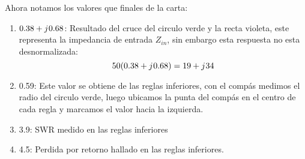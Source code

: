 \documentclass[
	12pt, %
	fleqn, %
	a4paper, %
]{LegrandOrangeBook}
\begin{document}
\begin{example}
\begin{center}
\end{center}
Ahora notamos los valores que finales de la carta:
\begin{enumerate}
\item $0.38+{j\mkern1mu} 0.68$: Resultado del cruce del circulo verde y la recta violeta, este representa la impedancia de entrada $Z_{in}$, sin embargo esta respuesta no esta desnormalizada:
\begin{displaymath}
50(0.38+{j\mkern1mu} 0.68)=19+{j\mkern1mu} 34
\end{displaymath}
\item 0.59: Este valor se obtiene de las reglas inferiores, con el compás medimos el radio del circulo verde, luego ubicamos la punta del compás en el centro de cada regla y marcamos el valor hacia la izquierda.
\item 3.9: SWR medido en las reglas inferiores
\item 4.5: Perdida por retorno hallado en las reglas inferiores.
\end{enumerate}
\end{example}
\newpage
\end{document}
